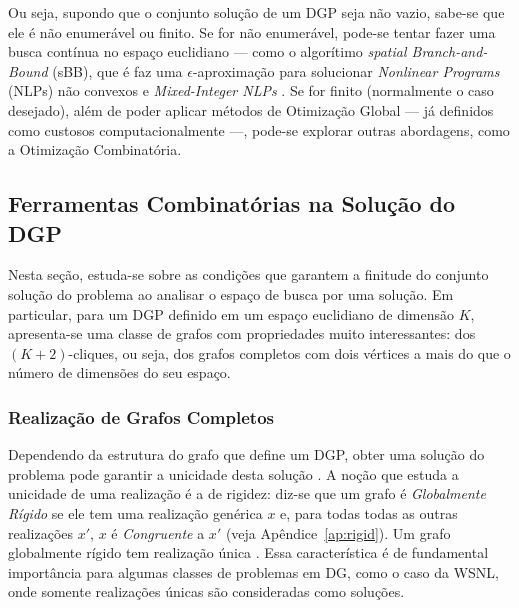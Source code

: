 Ou seja, supondo que o conjunto solução de um DGP seja não vazio, sabe-se que ele é não enumerável ou finito. Se for não enumerável, pode-se tentar fazer uma busca contínua no espaço euclidiano --- como o algorítimo \textit{spatial Branch-and-Bound} (sBB), que é faz uma $\epsilon$-aproximação para solucionar \textit{Nonlinear Programs} (NLPs) não convexos e \textit{Mixed-Integer NLPs} \cite{carlileGDandAplications}. Se for finito (normalmente o caso desejado), além de poder aplicar métodos de Otimização Global --- já definidos como custosos computacionalmente ---, pode-se explorar outras abordagens, como a Otimização Combinatória.

\subsection{Ferramentas Combinatórias na Solução do DGP}

Nesta seção, estuda-se sobre as condições que garantem a finitude do conjunto solução do problema ao analisar o espaço de busca por uma solução. Em particular, para um DGP definido em um espaço euclidiano de dimensão $K$, apresenta-se uma classe de grafos com propriedades muito interessantes: dos $(K+2)$-cliques, ou seja, dos grafos completos com dois vértices a mais do que o número de dimensões do seu espaço.

\subsubsection{Realização de Grafos Completos}


Dependendo da estrutura do grafo que define um DGP, obter uma solução do problema pode garantir a unicidade desta solução \cite{eren2004rigidity}. A noção que estuda a unicidade de uma realização é a de rigidez: diz-se que um grafo é \textit{Globalmente Rígido} se ele tem uma realização genérica $x$ e, para todas todas as outras realizações $x'$, $x$ é \textit{Congruente} a $x'$ (veja Apêndice~\ref{ap:rigid}). Um grafo globalmente rígido tem realização única \cite{rigidezGrafosEAplicacoesAnaCarlile}.
Essa característica é de fundamental importância para algumas classes de problemas em DG, como o caso da WSNL, onde somente realizações únicas são consideradas como soluções. 

